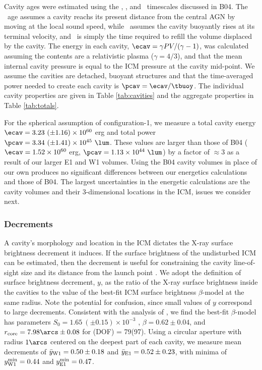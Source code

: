 \documentclass[11pt, preprint]{aastex}
\begin{document}
Cavity ages were estimated using the \tsonic, \tbuoy, and
\trefill\ timescales discussed in B04. The \tsonic\ age assumes a
cavity reachs its present distance from the central AGN by moving at
the local sound speed, while \tbuoy\ assumes the cavity buoyantly
rises at its terminal velocity, and \trefill\ is simply the time
required to refill the volume displaced by the cavity. The energy in
each cavity, $\ecav = \gamma PV/(\gamma-1)$, was calculated assuming
the contents are a relativistic plasma ($\gamma = 4/3$), and that the
mean internal cavity pressure is equal to the ICM pressure at the
cavity mid-point. We assume the cavities are detached, buoyant
structures and that the time-averaged power needed to create each
cavity is $\pcav = \ecav/\tbuoy$. The individual cavity properties are
given in Table \ref{tab:cavities} and the aggregate properties in
Table \ref{tab:totals}.

For the spherical assumption of configuration-1, we measure a total
cavity energy $\ecav = 3.23 ~(\pm 1.16) \times 10^{60}$ erg and total
power $\pcav = 3.34 ~(\pm 1.41) \times 10^{45} ~\lum$. These values
are larger than those of B04 ($\ecav = 1.52 \times 10^{60}$ erg,
$\pcav = 1.13 \times 10^{44} ~\lum$) by a factor of $\approx 3$ as a
result of our larger E1 and W1 volumes. Using the B04 cavity volumes
in place of our own produces no significant differences between our
energetics calculations and those of B04. The largest uncertainties in
the energetic calculations are the cavity volumes and their
3-dimensional locations in the ICM, issues we consider next.

\subsubsection{Decrements}
\label{sec:dec}

A cavity's morphology and location in the ICM dictates the X-ray
surface brightness decrement it induces. If the surface brightness of
the undisturbed ICM can be estimated, then the decrement is useful for
constraining the cavity line-of-sight size and its distance from the
launch point \citep[\ie\ \rlos\ and $z$, respectively; see][for
  details]{hydraa}. We adopt the \citet{hydraa} definition of surface
brightness decrement, $y$, as the ratio of the X-ray surface
brightness inside the cavities to the value of the best-fit ICM
surface brightness $\beta$-model at the same radius. Note the
potential for confusion, since small values of $y$ correspond to large
decrements. Consistent with the analysis of \citet{schindler01}, we
find the best-fit $\beta$-model has parameters $S_0 = 1.65 ~(\pm 0.15)
\times 10^{-3}$ \sbr, $\beta = 0.62 \pm 0.04$, and $r_{\rm{core}} =
7.98\arcs \pm 0.08$ for \chisq(DOF) = 79(97). Using a circular
aperture with radius $1\arcs$ centered on the deepest part of each
cavity, we measure mean decrements of $\bar{y}_{\rm{W1}} = 0.50 \pm
0.18$ and $\bar{y}_{\rm{E1}} = 0.52 \pm 0.23$, with minima of
$y^{\rm{min}}_{\rm{W1}} = 0.44$ and $y^{\rm{min}}_{\rm{E1}} = 0.47$.
\end{document}
